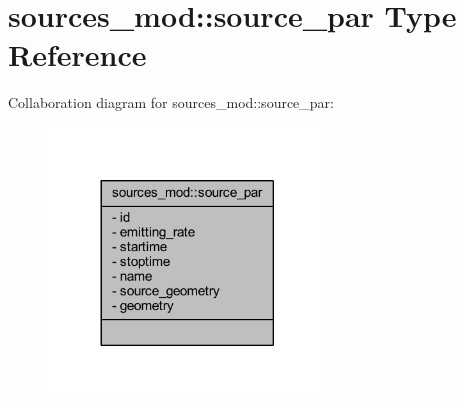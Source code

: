 \hypertarget{structsources__mod_1_1source__par}{}\section{sources\+\_\+mod\+:\+:source\+\_\+par Type Reference}
\label{structsources__mod_1_1source__par}


Collaboration diagram for sources\+\_\+mod\+:\+:source\+\_\+par\+:
\nopagebreak
\begin{figure}[H]
\begin{center}
\leavevmode
\includegraphics[width=209pt]{structsources__mod_1_1source__par__coll__graph}
\end{center}
\end{figure}
